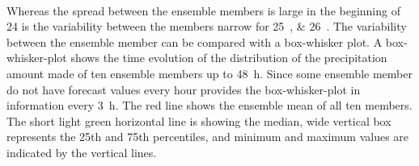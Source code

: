 \\
Whereas the spread between the ensemble members is large in the beginning of \SI{24}{\dec} is the variability between the members narrow for \SIlist{25;26}{\dec}. The variability between the ensemble member can be compared with a box-whisker plot. A box-whisker-plot shows the time evolution of the distribution of the precipitation amount made of ten ensemble members up to \SI{48}{\hour}. Since some ensemble member do not have forecast values every hour provides the box-whisker-plot in  information every \SI{3}{\hour}. The red line shows the ensemble mean of all ten members. The short light green horizontal line is showing the median, wide vertical box represents the 25th and 75th percentiles, and minimum and maximum values are indicated by the vertical lines.
\\
